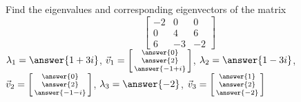 \documentclass{ximera}
\begin{document}
\begin{exercise}%
    Find the eigenvalues and corresponding eigenvectors of the matrix 
    \[ 
    \begin{bmatrix} 
    -2 & 0 & 0 \\ 
    0 & 4 & 6 \\ 
    6 & -3 & -2 
    \end{bmatrix} 
    \]
    $\lambda_1 = \answer{1+3i}$, $\vec{v}_1 = \left[\begin{smallmatrix} \answer{0}\\ \answer{2}\\ \answer{-1+i} \end{smallmatrix}\right]$, $\lambda_2 = \answer{1-3i}$, $\vec{v}_2 = \left[\begin{smallmatrix} \answer{0}\\ \answer{2}\\ \answer{-1-i} \end{smallmatrix}\right]$, $\lambda_3 = \answer{-2}$, $\vec{v}_3 = \left[\begin{smallmatrix} \answer{1}\\ \answer{2}\\ \answer{-2} \end{smallmatrix}\right]$
\end{exercise}
\end{document}
